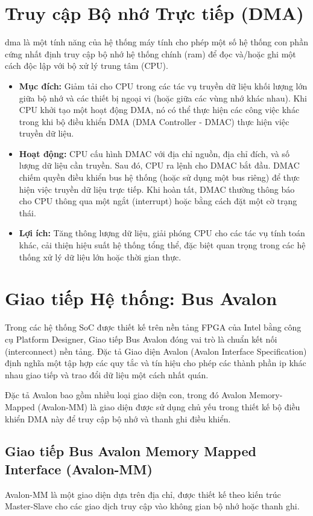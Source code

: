 \section{Truy cập Bộ nhớ Trực tiếp (DMA)}
\acrfull{dma} là một tính năng của hệ thống máy tính cho phép một số hệ thống con phần cứng nhất định truy cập bộ nhớ hệ thống chính (\acrshort{ram}) để đọc và/hoặc ghi một cách độc lập với bộ xử lý trung tâm (CPU).
\begin{itemize}
    \item \textbf{Mục đích:} Giảm tải cho CPU trong các tác vụ truyền dữ liệu khối lượng lớn giữa bộ nhớ và các thiết bị ngoại vi (hoặc giữa các vùng nhớ khác nhau). Khi CPU khởi tạo một hoạt động DMA, nó có thể thực hiện các công việc khác trong khi bộ điều khiển DMA (DMA Controller - DMAC) thực hiện việc truyền dữ liệu.
    \item \textbf{Hoạt động:} CPU cấu hình DMAC với địa chỉ nguồn, địa chỉ đích, và số lượng dữ liệu cần truyền. Sau đó, CPU ra lệnh cho DMAC bắt đầu. DMAC chiếm quyền điều khiển bus hệ thống (hoặc sử dụng một bus riêng) để thực hiện việc truyền dữ liệu trực tiếp. Khi hoàn tất, DMAC thường thông báo cho CPU thông qua một ngắt (interrupt) hoặc bằng cách đặt một cờ trạng thái.
    \item \textbf{Lợi ích:} Tăng thông lượng dữ liệu, giải phóng CPU cho các tác vụ tính toán khác, cải thiện hiệu suất hệ thống tổng thể, đặc biệt quan trọng trong các hệ thống xử lý dữ liệu lớn hoặc thời gian thực.
\end{itemize}

\section{Giao tiếp Hệ thống: Bus Avalon}
\label{sec:avalon_bus}
Trong các hệ thống SoC được thiết kế trên nền tảng FPGA của Intel bằng công cụ Platform Designer, Giao tiếp Bus Avalon đóng vai trò là chuẩn kết nối (interconnect) nền tảng. Đặc tả Giao diện Avalon (Avalon Interface Specification) \cite{avalon_mm_transfer} định nghĩa một tập hợp các quy tắc và tín hiệu cho phép các thành phần \acrshort{ip} khác nhau giao tiếp và trao đổi dữ liệu một cách nhất quán.

Đặc tả Avalon bao gồm nhiều loại giao diện con, trong đó Avalon Memory-Mapped (Avalon-MM) là giao diện được sử dụng chủ yếu trong thiết kế bộ điều khiển DMA này để truy cập bộ nhớ và thanh ghi điều khiển.

\subsection{Giao tiếp Bus Avalon Memory Mapped Interface (Avalon-MM)}
Avalon-MM là một giao diện dựa trên địa chỉ, được thiết kế theo kiến trúc Master-Slave cho các giao dịch truy cập vào không gian bộ nhớ hoặc thanh ghi.

